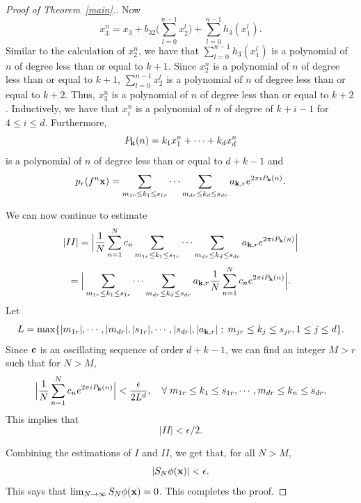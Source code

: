 \documentclass[10pt,a4paper]{amsart}
\begin{document}
\begin{proof}[Proof of Theorem~\ref{main}.]
Now
$$
x_{3}^{n} = x_{3} +b_{32} \Big( \sum_{l=0}^{n-1} x_{2}^{l} \Big) +\sum_{l=0}^{n-1} h_{3} (x_{1}^{l}).
$$
Similar to the calculation of $x_{2}^{n}$, we have that $\sum_{l=0}^{n-1} h_{3} (x_{1}^{l})$ is a polynomial of $n$ of degree less than or equal to $k+1$. Since $x_{2}^{n}$ is a polynomial of $n$ of degree less than or equal to $k+1$, $\sum_{l=0}^{n-1} x_{2}^{l}$ is a polynomial of $n$ of degree less than or equal to $k+2$. Thus, $x_{3}^{n}$ is a polynomial of $n$ of degree less than or equal to $k+2$. 
Inductively, we have that $x_{i}^{n}$ is a polynomial of $n$ of degree of $k+i-1$ for $4\leq i\leq d$. Furthermore,
$$
P_{{\bf k}} (n) = k_{1}x_{1}^{n}+\cdots +k_{d}x_{d}^{n}
$$
is a polynomial of $n$ of degree less than or equal to $d+k-1$ and 
$$
p_{r} (f^{n} {\bf x}) =  
\sum_{m_{1r} \leq k_{1}\leq s_{1r}} \cdots \sum_{ m_{dr} \leq k_{d}\leq s_{dr}} a_{{\bf k},r} e^{2\pi i P_{{\bf k}} (n)}.
$$

We can now continue to estimate 
$$
|II| =\Big|\frac{1}{N} \sum_{n=1}^{N} c_{n} \sum_{m_{1r} \leq k_{1}\leq s_{1r}} \cdots \sum_{m_{dr}\leq k_{d}\leq s_{dr}} a_{{\bf k},r} e^{2\pi i P_{{\bf k}} (n)}\Big| 
$$
$$
= \Big |\sum_{m_{1r}\leq k_{1}\leq s_{1r}}\cdots \sum_{m_{dr}\leq k_{d}\leq s_{dr}} a_{{\bf k},r} \frac{1}{N} \sum_{n=1}^{N} c_{n} e^{2\pi i P_{{\bf k}} (n)} \Big|.
$$
Let 
$$
L=\max \{ |m_{1r}|, \cdots, |m_{dr}|, |s_{1r}|, \cdots, |s_{dr}|, |a_{{\bf k},r}| \; ; \; m_{jr} \leq k_{j}\leq s_{jr}, 1\leq j\leq d\}.
$$
Since ${\bf c}$ is an oscillating sequence of order $d+k-1$, we can find an integer $M>r$ such that for $N>M$,
$$
\Big|\frac{1}{N} \sum_{n=1}^{N} c_{n} e^{2\pi i P_{{\bf k}} (n)} \Big|< \frac{\epsilon}{2L^{d}}, \quad \forall\; m_{1r} \leq k_{1}\leq s_{1r}, \cdots, m_{dr}\leq k_{n}\leq s_{dr}.
$$
This implies that 
$$
|II|< \epsilon/2.
$$

Combining the estimations of $I$ and $II$, we get that, for all $N>M$,
$$
|S_{N}\phi ({\bf x})|< \epsilon.
$$
This says that $\lim_{N\to \infty} S_{N}\phi({\bf x}) =0$. 
This completes the proof.
\end{proof}
\end{document}
